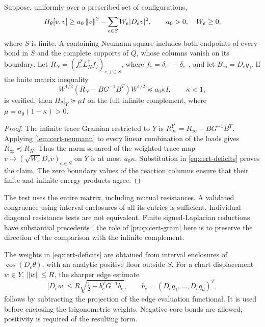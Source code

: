 \begin{proposition}\label{prop:cert-gram}
Suppose, uniformly over a prescribed set of configurations,
\begin{equation}\label{eq:cert-deficits}
 H_\theta[v,v]\ge a_0\left\lVert v\right\rVert^2
       -\sum_{e\in S}W_e|D_ev|^2,\qquad a_0>0,\quad W_e\ge0,
\end{equation}
where $S$ is finite. A containing Neumann square includes both endpoints
of every bond in $S$ and the complete supports of $Q$, whose columns
vanish on its boundary. Let
$R_N=(f_e^TL_N^\dagger f_f)_{e,f\in S}$, where
$f_e=\delta_{e^+}-\delta_{e^-}$, and let $B_{ej}=D_eq_j$.
If the finite matrix inequality
\begin{equation}\label{eq:cert-matrix-test}
 W^{1/2}(R_N-BG^{-1}B^T)W^{1/2}
       \preceq a_0\kappa I,\qquad \kappa<1,
\end{equation}
is verified, then $H_\theta|_Y\succeq\mu I$ on the full infinite
complement, where $\mu=a_0(1-\kappa)>0$.
\end{proposition}
\begin{proof}
The infinite trace Gramian restricted to $Y$ is
$R_\infty^Y=R_\infty-BG^{-1}B^T$. Applying
\cref{lem:cert-neumann} to every linear combination of the loads gives
$R_\infty\preceq R_N$. Thus the norm squared of the weighted trace
map $v\mapsto (\sqrt{W_e}D_ev)_{e\in S}$ on $Y$ is at most
$a_0\kappa$. Substitution in \eqref{eq:cert-deficits} proves the claim.
The zero boundary values of the reaction columns ensure that their
finite and infinite energy products agree.
\end{proof}

The test uses the entire matrix, including mutual resistances. A
validated congruence using interval enclosures of all its entries is
sufficient. Individual diagonal resistance tests are not equivalent.
Finite signed-Laplacian reductions have substantial precedents
\cite{Chen2020}; the role of \cref{prop:cert-gram} here is to preserve
the direction of the comparison with the infinite complement.

The weights in \eqref{eq:cert-deficits} are obtained from interval
enclosures of $\cos(D_e\theta)$, with an analytic positive floor outside
$S$. For a chart displacement $w\in Y$, $\left\lVert w\right\rVert\le R$, the sharper
edge estimate
\begin{equation}\label{eq:cert-deflated-edge}
 |D_ew|\le R\sqrt{\tfrac12-b_e^TG^{-1}b_e},
 \qquad b_e=(D_eq_1,\ldots,D_eq_d)^T,
\end{equation}
follows by subtracting the projection of the edge evaluation functional.
It is used before enclosing the trigonometric weights. Negative core
bonds are allowed; positivity is required of the resulting form.

